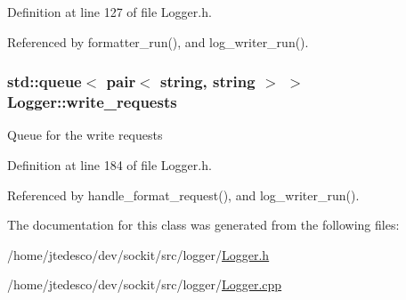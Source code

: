 Definition at line 127 of file Logger.h.



Referenced by formatter\_\-run(), and log\_\-writer\_\-run().

\hypertarget{classLogger_ac6f7534f905bc9b903b35549fa526688}{
\subsubsection[{write\_\-requests}]{\setlength{\rightskip}{0pt plus 5cm}std::queue$<$ pair$<$ string, string $>$ $>$ {\bf Logger::write\_\-requests}}}
\label{classLogger_ac6f7534f905bc9b903b35549fa526688}
Queue for the write requests 

Definition at line 184 of file Logger.h.



Referenced by handle\_\-format\_\-request(), and log\_\-writer\_\-run().



The documentation for this class was generated from the following files:\begin{DoxyCompactItemize}
\item 
/home/jtedesco/dev/sockit/src/logger/\hyperlink{Logger_8h}{Logger.h}\item 
/home/jtedesco/dev/sockit/src/logger/\hyperlink{Logger_8cpp}{Logger.cpp}\end{DoxyCompactItemize}
